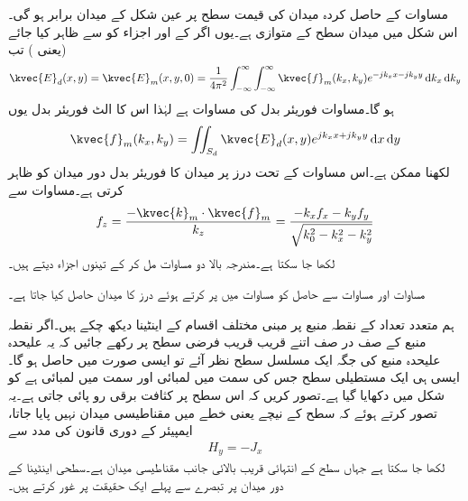 مساوات  کے حاصل کردہ میدان کی قیمت سطح  پر  عین شکل  کے میدان برابر ہو گی۔اس شکل میں میدان  سطح کے متوازی ہے۔یوں اگر  کے  اور  اجزاء کو  سے ظاہر کیا جائے (یعنی ) تب
\begin{align}\label{مساوات_اینٹینا_دور_میدان_فوریئر_الف}
\kvec{E}_d (x,y)=\kvec{E}_m(x,y,0)=\frac{1}{4\pi^2} \int_{-\infty}^{\infty} \int_{-\infty}^{\infty} \kvec{f}_m(k_x,k_y)e^{-j k_x x -j k_y y} \dif k_x \dif k_y
\end{align}
ہو گا۔مساوات  فوریئر بدل کی مساوات ہے لہٰذا اس کا الٹ فوریئر بدل یوں
\begin{align}\label{مساوات_اینٹینا_دور_میدان_فوریئر_ب}
\kvec{f}_m(k_x,k_y)=\iint_{S_d} \kvec{E}_d(x,y) e^{j k_x x +j k_y y} \dif x \dif y
\end{align}
 لکھنا ممکن ہے۔اس مساوات کے تحت درز پر میدان کا فوریئر بدل دور میدان کو ظاہر کرتی ہے۔مساوات  سے
\begin{align}\label{مساوات_اینٹینا_دور_میدان_فوریئر_پ}
f_z=\frac{-\kvec{k}_m\cdot\kvec{f}_m}{k_z}=\frac{-k_x f_x-k_y f_y}{\sqrt{k_0^2-k_x^2-k_y^2}}
\end{align}
لکھا جا سکتا ہے۔مندرجہ بالا دو مساوات مل کر   کے تینوں اجزاء دیتے ہیں۔

مساوات  اور مساوات  سے حاصل   کو مساوات  میں پر کرتے ہوئے درز کا میدان حاصل کیا جاتا ہے۔

ہم متعدد تعداد کے نقطہ منبع پر مبنی مختلف اقسام کے اینٹینا دیکھ چکے ہیں۔اگر نقطہ منبع کے صف در صف اتنے قریب قریب فرضی سطح پر رکھے جائیں کہ یہ علیحدہ علیحدہ منبع کی جگہ ایک مسلسل سطح نظر آئے تو ایسی صورت میں  حاصل ہو گا۔ایسی ہی ایک مستطیلی سطح جس کی  سمت میں لمبائی  اور  سمت میں لمبائی  ہے کو شکل  میں دکھایا گیا ہے۔تصور کریں کہ اس سطح پر  کثافت برقی رو پائی جاتی ہے۔یہ تصور کرتے ہوئے کہ سطح کے نیچے یعنی  خطے میں مقناطیسی میدان نہیں پایا جاتا، ایمپیئر کے دوری قانون کی مدد سے 
\begin{align}\label{مساوات_اینٹینا_فرضی_کثافت_رو}
H_y=-J_x
\end{align}
لکھا جا سکتا ہے جہاں  سطح کے انتہائی قریب بالائی جانب مقناطیسی میدان ہے۔سطحی اینٹینا کے دور میدان پر تبصرے سے پہلے ایک حقیقت پر غور کرتے ہیں۔

